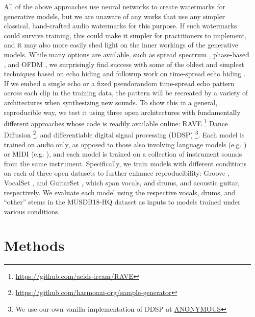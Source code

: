 \documentclass[letterpaper]{article} %
\begin{document}
All of the above approaches use neural networks to create watermarks for generative models, but we are unaware of any works that use any simpler classical, hand-crafted audio watermarks for this purpose.  If such watermarks could survive training, this could make it simpler for practitioners to implement, and it may also more easily shed light on the inner workings of the generative models.  While many options are available, such as spread spectrum \cite{kirovski2001robust}, phase-based \cite{xiaoxiao_dong_data_2004, malik_robust_2007}, and OFDM \cite{eichelberger_receiving_2019}, we surprisingly find success with some of the oldest and simplest techniques based on echo hiding \cite{gruhl1996echo} and followup work on time-spread echo hiding \cite{ko2005time}.  If we embed a single echo or a fixed pseudorandom time-spread echo pattern across each clip in the training data, the pattern will be recreated by a variety of architectures when synthesizing new sounds.  To show this in a general, reproducible way, we test it using three open architectures with fundamentally different approaches whose code is readily available online: RAVE \cite{caillon2021rave}\footnote{ \url{https://github.com/acids-ircam/RAVE} } Dance Diffusion \cite{evans2022dancediffusion} \footnote{ \url{https://github.com/harmonai-org/sample-generator} }, and differentiable digital signal processing (DDSP) \cite{engelddsp}\footnote{We use our own vanilla implementation of DDSP at \url{ANONYMOUS}}.  Each model is trained on audio only, as opposed to those also involving language models (e.g. \cite{evans2024fast}) or MIDI (e.g. \cite{hawthornemulti}), and each model is trained on a collection of instrument sounds from the same instrument.  Specifically, we train models with different conditions on each of three open datasets to further enhance reproducibility: Groove \cite{groove2019}, VocalSet \cite{wilkins2018vocalset}, and GuitarSet \cite{xi2018guitarset}, which span vocals, and drums, and acoustic guitar, respectively.  We evaluate each model using the respective vocals, drums, and ``other'' stems in the MUSDB18-HQ dataset \cite{musdb18-hq} as inputs to models trained under various conditions.  %




\section{Methods}
\end{document}
